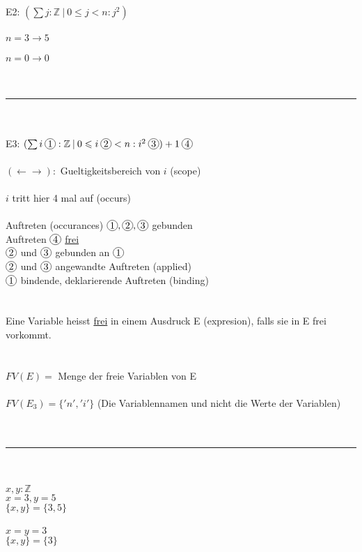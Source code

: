 \documentclass[18pt,a4paper]{article}
\newcommand*\circled[1]{\tikz[baseline=(char.base)]{
            \node[shape=circle,draw,inner sep=1pt] (char) {#1};}}
\newcommand{\tab}{\hspace*{2em}}
\begin{document}
E2: \tab$(\sum{j} : \mathbb{Z} \:\vert\: 0\leqslant j < n : j^2 )$\\
\\
$n = 3 \rightarrow 5$\\
\\
$n = 0 \rightarrow 0$\\
\\
\\
\rule{\textwidth}{0.4mm}\\
\\
E3: $(\sum{i} \:\circled{1} : \mathbb{Z} \:\vert\: 0\leqslant i \:\circled{2} < n : i^2 \:\circled{3} ) + 1 \:\circled{4}$\\
\\
$(\leftarrow \rightarrow) :$ Gueltigkeitsbereich von $i$ (scope)\\
\\
$i$ tritt hier 4 mal auf (occurs)\\
\\
Auftreten (occurances) $\circled{1}, \circled{2}, \circled{3}$ gebunden\\
Auftreten $\circled{4}$ \uline{frei}\\
$\circled{2}$ und $\circled{3}$ gebunden an $\circled{1}$\\
$\circled{2}$ und $\circled{3}$ angewandte Auftreten (applied)\\
$\circled{1}$ bindende, deklarierende Auftreten (binding)\\
\\
\\
Eine Variable heisst \uline{frei} in einem Ausdruck E (expresion), falls sie in E frei vorkommt.\\
\\
\\
$FV(E) =$ Menge der freie Variablen von E\\
\\
$FV(E_3) = \{'n', 'i'\}$ (Die Variablennamen und nicht die Werte der Variablen)\\
\\
\\
\rule{\textwidth}{0.4mm}\\
\\
$x, y : \mathbb{Z}$\\
$x = 3, y = 5$\\
$\{x, y\} = \{3, 5\}$\\
\\
$x = y = 3$\\
$\{x, y\} = \{3\}$\\
\\
\end{document}
